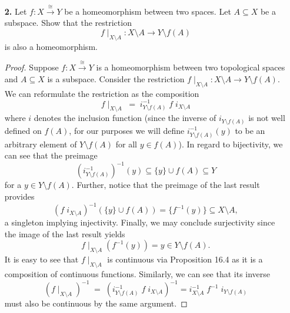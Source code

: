 \documentclass[ 12pt ]{article}
\begin{document}
\begin{enumerate}
\begin{proof}
\begin{enumerate}
				\item[\textbf{d.}] Suppose $\mathrm{id} : \mathbb{R}_\mathrm{cc} \to \mathbb{R}_\ell$ denotes the identity function between $\mathbb{R}_\mathrm{cc}$ and
					$\mathbb{R}_\ell$. Notice that $$\lim_{n \to \infty} \mathrm{id}(x_n) = \lim_{n \to \infty} x_n = x = \mathrm{id}(x) \in \mathbb{R}_\ell$$ for any sequence $\{ x_n
					\}$ converging to $x \in \mathbb{R}_\mathrm{cc}$. However, consider an arbitrary open interval $[a, b) \subseteq \mathbb{R}_\ell$ with $x \in [a, b)$. Then it follows
					that $\mathrm{id}^{-1}[a, b) = [a, b) \subseteq \mathbb{R}_\mathrm{cc}$. Observe that $(-\infty, a) \subseteq \mathbb{R} \setminus [a, b)$ is a nondegenerate interval
					of $\mathbb{R}$ containing an uncountable collection. Hence $\mathrm{id}^{-1}[a, b)$ is not open in $\mathbb{R}_\mathrm{cc}$ implying that $\mathrm{id}$ is continuous
					nowhere.
			\end{enumerate}
		\end{proof}


	\item[\textbf{2.}] Let $f : X \overset{\cong}{\to} Y$ be a homeomorphism between two spaces. Let $A \subseteq X$ be a subspace. Show that the restriction $$f \mid_{X \setminus A} :
		X \setminus A \to Y \setminus f(A)$$ is also a homeomorphism.

		\begin{proof}
			Suppose $f : X \overset{\cong}{\to} Y$ is a homeomorphism between two topological spaces and $A \subseteq X$ is a subspace. Consider the restriction $f \mid_{X \setminus A} :
			X \setminus A \to Y \setminus f(A)$. We can reformulate the restriction as the composition $$f \mid_{X \setminus A}\; =\; i_{Y \setminus f(A)}^{-1}\; f\; i_{X \setminus A}$$
			where $i$ denotes the inclusion function (since the inverse of $i_{Y \setminus f(A)}$ is not well defined on $f(A)$, for our purposes we will define $i_{Y \setminus f(A)}^{-1
			}(y)$ to be an arbitrary element of $Y \setminus f(A)$ for all $y \in f(A)$). In regard to bijectivity, we can see that the preimage $$\left (i_{Y \setminus f(A)}^{-1} \right
			)^{-1}(y) \subseteq \{ y \} \cup f(A) \subseteq Y$$ for a $y \in Y \setminus f(A)$. Further, notice that the preimage of the last result provides $$\left (f\; i_{X \setminus A}
			\right )^{-1}\left(\{ y \} \cup f(A)\right) = \{ f^{-1}(y) \} \subseteq X \setminus A,$$ a singleton implying injectivity. Finally, we may conclude surjectivity since the
			image of the last result yields $$f \mid_{X \setminus A}\left(f^{-1}(y)\right) = y \in Y \setminus f(A).$$ It is easy to see that $f \mid_{X \setminus A}$ is continuous via
			Proposition 16.4 as it is a composition of continuous functions. Similarly, we can see that its inverse $$\left(f \mid_{X \setminus A}\right)^{-1}\; =\; \left(i_{Y \setminus
			f(A)}^{-1}\; f\; i_{X \setminus A}\right)^{-1} = i_{X \setminus A}^{-1}\; f^{-1}\; i_{Y \setminus f(A)}$$ must also be continuous by the same argument. 
		\end{proof}



\end{enumerate}
\end{document}
